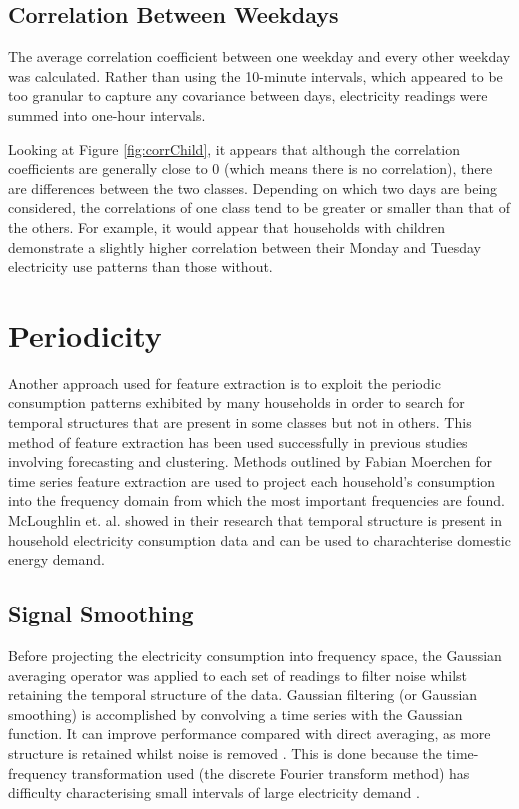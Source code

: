 \logADVChild
\logADVSocio

\subsection*{Correlation Between Weekdays}

The average correlation coefficient between one weekday and every other weekday was calculated. Rather than using the 10-minute intervals, which appeared to be too granular to capture any covariance between days, electricity readings were summed into one-hour intervals.


\corrChild

Looking at Figure \ref{fig:corrChild}, it appears that although the correlation coefficients are generally close to 0 (which means there is no correlation), there are differences between the two classes. Depending on which two days are being considered, the correlations of one class tend to be greater or smaller than that of the others. For example, it would appear that households with children demonstrate a slightly higher correlation between their Monday and Tuesday electricity use patterns than those without.

\corrSocio 


\section{Periodicity}

Another approach used for feature extraction is to exploit the periodic consumption patterns exhibited by many households in order to search for temporal structures that are present in some classes but not in others. This method of feature extraction has been used successfully in previous studies involving forecasting and clustering. Methods outlined by Fabian Moerchen \cite{Moerchen} for time series feature extraction are used to project each household's consumption into the frequency domain from which the most important frequencies are found. McLoughlin et. al. \cite{McLoughlin} showed in their research that temporal structure is present in household electricity consumption data and can be used to charachterise domestic energy demand.


\subsection*{Signal Smoothing}

Before projecting the electricity consumption into frequency space, the Gaussian averaging operator was applied to each set of readings to filter noise whilst retaining the temporal structure of the data. Gaussian filtering (or Gaussian smoothing) is accomplished by convolving a time series with the Gaussian function. It can improve performance compared with direct averaging, as more structure is retained whilst noise is removed \cite{Nixon}. This is done because the time-frequency transformation used (the discrete Fourier transform method) has difficulty characterising small intervals of large electricity demand \cite{Graps}.



